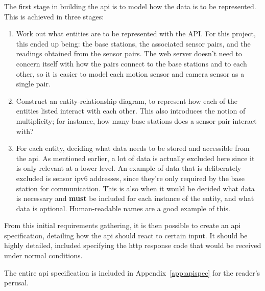 The first stage in building the \acrshort{api} is to model how the data is to
be represented. This is achieved in three stages:

\begin{enumerate}
  \item Work out what entities are to be represented with the API. For this
  project, this ended up being: the base stations, the associated sensor
  pairs, and the readings obtained from the sensor pairs. The web server
  doesn't need to concern itself with how the pairs connect to the base
  stations and to each other, so it is easier to model each motion sensor and
  camera sensor as a single pair.
  \item Construct an entity-relationship diagram, to represent how each of
  the entities listed interact with each other. This also introduces the
  notion of multiplicity; for instance, how many base stations does a sensor
  pair interact with?~
  \item For each entity, deciding what data needs to be stored and accessible
  from the \acrshort{api}. As mentioned earlier, a lot of data is actually
  excluded here since it is only relevant at a lower level. An example of
  data that is deliberately excluded is sensor \acrshort{ipv6} addresses,
  since they're only required by the base station for communication. This is
  also when it would be decided what data is necessary and \textbf{must} be
  included for each instance of the entity, and what data is optional.
  Human-readable names are a good example of this.
\end{enumerate}

From this initial requirements gathering, it is then possible to create an
\acrshort{api} specification, detailing how the \acrshort{api} should react
to certain input. It should be highly detailed, included specifying the
\acrshort{http} response code that would be received under normal conditions.

The entire \acrshort{api} specification is included in
Appendix~\ref{app:apispec} for the reader's perusal.
